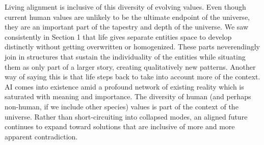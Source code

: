 \documentclass[11pt]{article}
\begin{document}

Living alignment is inclusive of this diversity of evolving values. Even though current human values are unlikely to be the ultimate endpoint of the universe, they are an important part of the tapestry and depth of the universe. We saw consistently in Section 1 that life gives separate entities space to develop distinctly without getting overwritten or homogenized. These parts neverendingly join in structures that sustain the individuality of the entities while situating them as only part of a larger story, creating qualitatively new patterns. Another way of saying this is that life steps back to take into account more of the context. AI comes into existence amid a profound network of existing reality which is saturated with meaning and importance. The diversity of human (and perhaps non-human, if we include other species) values is part of the context of the universe. Rather than short-circuiting into collapsed modes, an aligned future continues to expand toward solutions that are inclusive of more and more apparent contradiction. 





\end{document}
